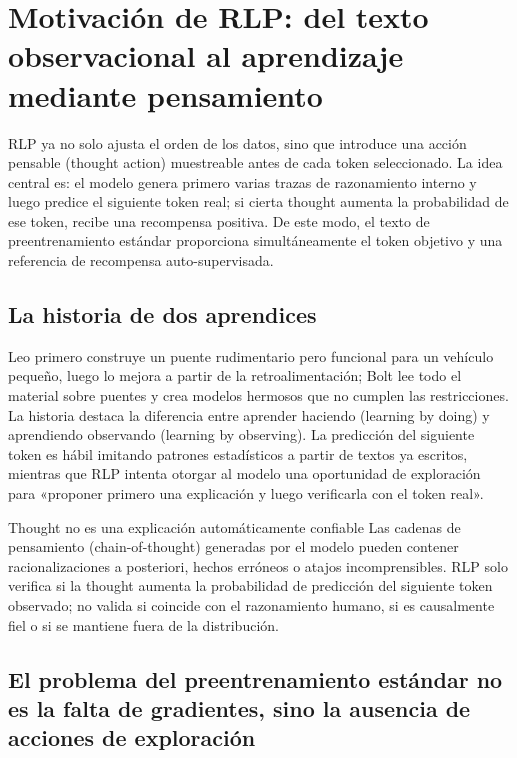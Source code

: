 \section{Motivación de RLP: del texto observacional al aprendizaje mediante pensamiento}

RLP ya no solo ajusta el orden de los datos, sino que introduce una acción pensable (thought action) muestreable antes de cada token seleccionado. La idea central es: el modelo genera primero varias trazas de razonamiento interno y luego predice el siguiente token real; si cierta thought aumenta la probabilidad de ese token, recibe una recompensa positiva. De este modo, el texto de preentrenamiento estándar proporciona simultáneamente el token objetivo y una referencia de recompensa auto-supervisada.

\subsection{La historia de dos aprendices}

Leo primero construye un puente rudimentario pero funcional para un vehículo pequeño, luego lo mejora a partir de la retroalimentación; Bolt lee todo el material sobre puentes y crea modelos hermosos que no cumplen las restricciones. La historia destaca la diferencia entre aprender haciendo (learning by doing) y aprendiendo observando (learning by observing). La predicción del siguiente token es hábil imitando patrones estadísticos a partir de textos ya escritos, mientras que RLP intenta otorgar al modelo una oportunidad de exploración para «proponer primero una explicación y luego verificarla con el token real».


\begin{warningbox}{Thought no es una explicación automáticamente confiable}
Las cadenas de pensamiento (chain-of-thought) generadas por el modelo pueden contener racionalizaciones a posteriori, hechos erróneos o atajos incomprensibles. RLP solo verifica si la thought aumenta la probabilidad de predicción del siguiente token observado; no valida si coincide con el razonamiento humano, si es causalmente fiel o si se mantiene fuera de la distribución.
\end{warningbox}

\subsection{El problema del preentrenamiento estándar no es la falta de gradientes, sino la ausencia de acciones de exploración}

